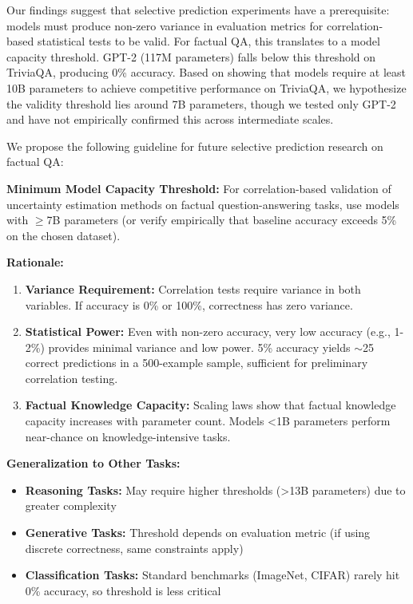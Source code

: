 Our findings suggest that selective prediction experiments have a prerequisite: models must produce non-zero variance in evaluation metrics for correlation-based statistical tests to be valid. For factual QA, this translates to a model capacity threshold. GPT-2 (117M parameters) falls below this threshold on TriviaQA, producing 0\% accuracy. Based on \citet{Roberts2020} showing that models require at least 10B parameters to achieve competitive performance on TriviaQA, we hypothesize the validity threshold lies around 7B parameters, though we tested only GPT-2 and have not empirically confirmed this across intermediate scales.

We propose the following guideline for future selective prediction research on factual QA:

\textbf{Minimum Model Capacity Threshold:} For correlation-based validation of uncertainty estimation methods on factual question-answering tasks, use models with $\geq$7B parameters (or verify empirically that baseline accuracy exceeds 5\% on the chosen dataset).

\textbf{Rationale:}
\begin{enumerate}
\item \textbf{Variance Requirement:} Correlation tests require variance in both variables. If accuracy is 0\% or 100\%, correctness has zero variance.
\item \textbf{Statistical Power:} Even with non-zero accuracy, very low accuracy (e.g., 1-2\%) provides minimal variance and low power. 5\% accuracy yields $\sim$25 correct predictions in a 500-example sample, sufficient for preliminary correlation testing.
\item \textbf{Factual Knowledge Capacity:} Scaling laws \citep{Kaplan2020,Brown2020} show that factual knowledge capacity increases with parameter count. Models <1B parameters perform near-chance on knowledge-intensive tasks.
\end{enumerate}

\textbf{Generalization to Other Tasks:}
\begin{itemize}
\item \textbf{Reasoning Tasks:} May require higher thresholds (>13B parameters) due to greater complexity
\item \textbf{Generative Tasks:} Threshold depends on evaluation metric (if using discrete correctness, same constraints apply)
\item \textbf{Classification Tasks:} Standard benchmarks (ImageNet, CIFAR) rarely hit 0\% accuracy, so threshold is less critical
\end{itemize}


